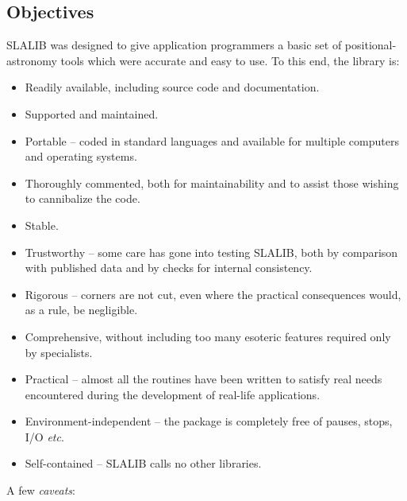 \documentclass[11pt,twoside,nolof]{starlink}
\begin{document}
\subsection{Objectives}
SLALIB was designed to give application programmers
a basic set of positional-astronomy tools which were
accurate and easy to use.  To this end, the library is:
\begin{itemize}
\item Readily available, including source code and documentation.
\item Supported and maintained.
\item Portable -- coded in standard languages and available for
multiple computers and operating systems.
\item Thoroughly commented, both for maintainability and to
assist those wishing to cannibalize the code.
\item Stable.
\item Trustworthy -- some care has gone into
testing SLALIB, both by comparison with published data and
by checks for internal consistency.
\item Rigorous -- corners are not cut,
even where the practical consequences would, as a rule, be
negligible.
\item Comprehensive, without including too many esoteric features
required only by specialists.
\item Practical -- almost all the routines have been written to
satisfy real needs encountered during the development of
real-life applications.
\item Environment-independent -- the package is
completely free of pauses, stops, I/O \textit{etc}.
\item Self-contained -- SLALIB calls no other libraries.
\end{itemize}
A few \textit{caveats}:
\end{document}
